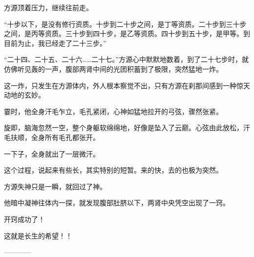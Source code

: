 \begin{this_body}
方源顶着压力，继续往前走。

“十步以下，是没有修行资质。十步到二十步之间，是丁等资质。二十步到三十步之间，是丙等资质。三十步到四十步，是乙等资质。四十步到五十步，是甲等。到目前为止，我已经走了二十三步。”

“二十四、二十五、二十六……二十七。”方源心中默默地数着，到了二十七步时，就仿佛听见轰的一声，腹部两肾中间的光团积蓄到了极限，突然猛地一炸。

这一炸，只发生在方源体内，外人根本察觉不出，只有方源在刹那间感到一种惊天动地的玄妙。

霎时，他全身汗毛乍立，毛孔紧闭，心神如猛地拉开的弓弦，骤然张紧。

旋即，脑海忽然一空，整个身躯软绵绵地，好像是坠入了云巅。心弦由此放松，汗毛扶顺，全身所有毛孔都张开。

一下子，全身就出了一层微汗。

这个过程，说起来有些长，其实特别的短暂。来的快，去的也极为突然。

方源失神只是一瞬，就回过了神。

他暗中凝神往体内一探，就发现腹部肚脐以下，两肾中央凭空出现了一窍。

开窍成功了！

这就是长生的希望！！

------------

\end{this_body}

